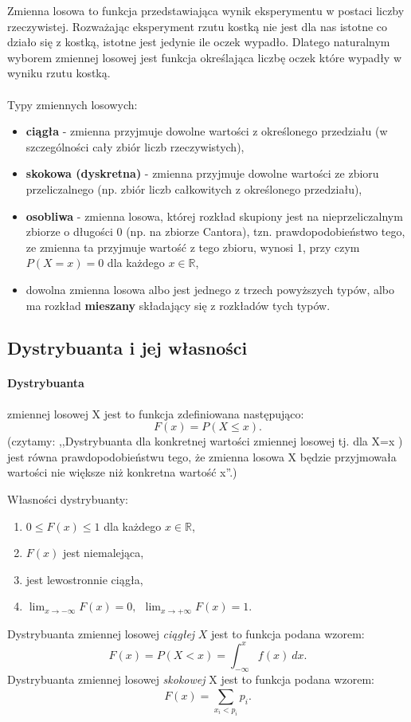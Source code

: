 \documentclass[]{report}
\begin{document}
Zmienna losowa to funkcja przedstawiająca wynik eksperymentu w postaci liczby rzeczywistej. Rozważając eksperyment rzutu kostką nie jest dla nas istotne co działo się z kostką, istotne jest jedynie ile oczek wypadło. Dlatego naturalnym wyborem zmiennej losowej jest funkcja określająca liczbę oczek które wypadły w wyniku rzutu kostką. \\\\
Typy zmiennych losowych:
\begin{itemize}
\item \textbf{ciągła} - zmienna przyjmuje dowolne wartości z określonego przedziału (w szczególności cały zbiór liczb rzeczywistych),
\item \textbf{skokowa (dyskretna)} - zmienna przyjmuje dowolne wartości ze zbioru przeliczalnego (np. zbiór liczb całkowitych z określonego przedziału),
\item \textbf{osobliwa} - zmienna losowa, której rozkład skupiony jest na nieprzeliczalnym zbiorze o długości 0 (np. na zbiorze Cantora), tzn. prawdopodobieństwo tego, ze zmienna ta przyjmuje wartość z tego zbioru, wynosi 1, przy czym $P(X = x) = 0$ dla każdego $x \in \mathbb{R}$,
\item dowolna zmienna losowa albo jest jednego z trzech powyższych typów, albo ma rozkład \textbf{mieszany} składający się z rozkładów tych typów.
\end{itemize}

\subsection{Dystrybuanta i jej własności}
\paragraph{Dystrybuanta} zmiennej losowej X  jest to funkcja zdefiniowana następująco:
\begin{equation}
F(x) = P(X \le x).
\end{equation}
(czytamy: ,,Dystrybuanta dla konkretnej wartości zmiennej losowej tj. dla X=x ) jest równa prawdopodobieństwu tego, że zmienna losowa X będzie przyjmowała wartości nie większe niż konkretna wartość  x''.)

Własności dystrybuanty:
\begin{enumerate}
\item $0 \le F(x) \le 1$ dla każdego $x \in \mathbb{R}$,
\item $F(x)$ jest niemalejąca,
\item jest lewostronnie ciągła,
\item $\lim_{x \to - \infty} F(x) = 0, ~~\lim_{x \to + \infty} F(x) = 1.$
\end{enumerate}
\medskip
Dystrybuanta zmiennej losowej \emph{ciągłej} $X$ jest to funkcja podana wzorem:
\begin{equation}
F(x) = P(X < x) = \int_{-\infty}^{x} f(x)~dx.
\end{equation}
\medskip
Dystrybuanta zmiennej losowej \emph{skokowej} X jest to funkcja podana wzorem:
\begin{equation}
F(x)=\sum_{x_i < p_i}^{} p_i.
\end{equation}
\end{document}
